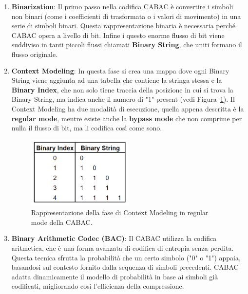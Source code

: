 \documentclass[a4paper,12pt, oneside]{article}
\begin{document}
\begin{enumerate}
    \item \textbf{Binarization}: Il primo passo nella codifica CABAC è convertire i simboli
    non binari (come i coefficienti di trasformata o i valori di movimento) in una serie di simboli binari.
    Questa rappresentazione binaria è necessaria perché CABAC opera a livello di bit. Infine i questo enorme
    flusso di bit viene suddiviso in tanti piccoli flussi chiamati \textbf{Binary String}, che uniti formano
    il flusso originale.
    
    \item \textbf{Context Modeling}: In questa fase si crea una mappa dove ogni Binary String viene
    aggiunta ad una tabella che contiene la stringa stessa e la \textbf{Binary Index}, che non solo
    tiene traccia della posizione in cui si trova la Binary String, ma indica anche il numero di "1"
    present (vedi Figura~\ref{fig:CABAC_regular}). Il Context Modeling ha due modalità di esecuzione,
    quella appena descritta è la \textbf{regular mode}, mentre esiste anche la \textbf{bypass mode}
    che non comprime per nulla il flusso di bit, ma li codifica così come sono.
    
    \begin{figure}[h]
        \centering
        \includegraphics[width=0.5\textwidth]{images/CABAC-regular.png}
        \caption{Rappresentazione della fase di Context Modeling in regular mode della CABAC.}
        \label{fig:CABAC_regular}
    \end{figure}
    
    \item \textbf{Binary Arithmetic Codec (BAC)}: Il CABAC utilizza la codifica aritmetica, che è una forma
    avanzata di codifica di entropia senza perdita. Questa tecnica sfrutta la probabilità che un certo simbolo
    ("0" o "1") appaia, basandosi sul contesto fornito dalla sequenza di simboli precedenti. CABAC adatta
    dinamicamente il modello di probabilità in base ai simboli già codificati, migliorando così l'efficienza
    della compressione.
\end{enumerate}
\end{document}
